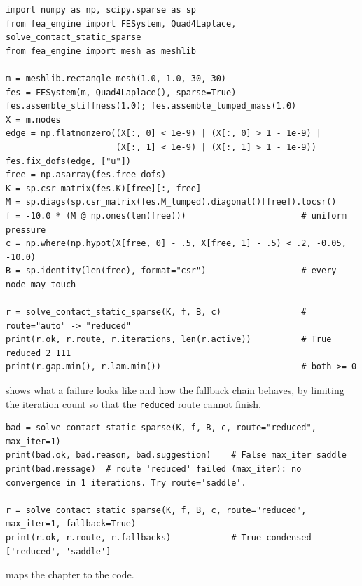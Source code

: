 \begin{lstlisting}[caption={The membrane obstacle problem with \texttt{Quad4Laplace} and the sparse contact solver.},label={lst:ct-static}]
import numpy as np, scipy.sparse as sp
from fea_engine import FESystem, Quad4Laplace, solve_contact_static_sparse
from fea_engine import mesh as meshlib

m = meshlib.rectangle_mesh(1.0, 1.0, 30, 30)
fes = FESystem(m, Quad4Laplace(), sparse=True)
fes.assemble_stiffness(1.0); fes.assemble_lumped_mass(1.0)
X = m.nodes
edge = np.flatnonzero((X[:, 0] < 1e-9) | (X[:, 0] > 1 - 1e-9) |
                      (X[:, 1] < 1e-9) | (X[:, 1] > 1 - 1e-9))
fes.fix_dofs(edge, ["u"])
free = np.asarray(fes.free_dofs)
K = sp.csr_matrix(fes.K)[free][:, free]
M = sp.diags(sp.csr_matrix(fes.M_lumped).diagonal()[free]).tocsr()
f = -10.0 * (M @ np.ones(len(free)))                       # uniform pressure
c = np.where(np.hypot(X[free, 0] - .5, X[free, 1] - .5) < .2, -0.05, -10.0)
B = sp.identity(len(free), format="csr")                   # every node may touch

r = solve_contact_static_sparse(K, f, B, c)                # route="auto" -> "reduced"
print(r.ok, r.route, r.iterations, len(r.active))          # True reduced 2 111
print(r.gap.min(), r.lam.min())                            # both >= 0
\end{lstlisting}

 shows what a failure looks like and how the fallback chain behaves, by limiting the iteration count so that the \texttt{reduced} route cannot finish.

\begin{lstlisting}[caption={A route that cannot finish reports why and what to try; fallback is opt-in.},label={lst:ct-fail}]
bad = solve_contact_static_sparse(K, f, B, c, route="reduced", max_iter=1)
print(bad.ok, bad.reason, bad.suggestion)    # False max_iter saddle
print(bad.message)  # route 'reduced' failed (max_iter): no convergence in 1 iterations. Try route='saddle'.

r = solve_contact_static_sparse(K, f, B, c, route="reduced", max_iter=1, fallback=True)
print(r.ok, r.route, r.fallbacks)            # True condensed ['reduced', 'saddle']
\end{lstlisting}

 maps the chapter to the code.

